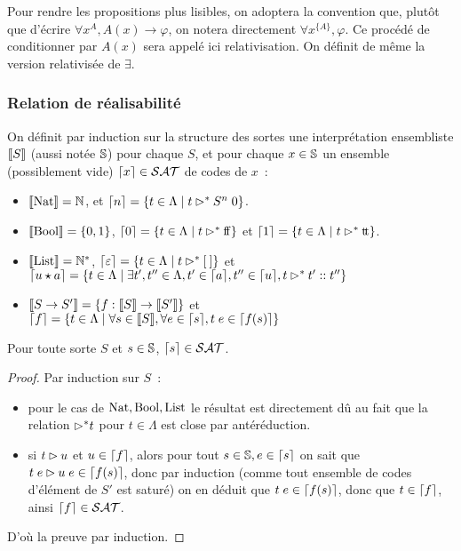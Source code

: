 \documentclass{article}
\begin{document}
\begin{nota}
  Pour rendre les propositions plus lisibles, on adoptera la convention que, plutôt que d'écrire $\forall x^A, A(x) \to \varphi$, on notera directement $\forall x^{\{A\}}, \varphi$. Ce procédé de conditionner par $A(x)$ sera appelé ici relativisation. On définit de même la version relativisée de $\exists$.
\end{nota}

\subsubsection{Relation de réalisabilité}

On définit par induction sur la structure des sortes une interprétation ensembliste $\llbracket S \rrbracket$ (aussi notée $\mathbb{S}$) pour chaque $S$, et pour chaque $x \in \mathbb{S}$ un ensemble (possiblement vide) $\lceil x \rceil\in \mathcal {SAT}$ de codes de $x$~:
\begin{itemize}
\item $\llbracket \mathrm{Nat} \rrbracket = \mathbb{N}$, et $\lceil n \rceil = \{t\in\Lambda\mid t \rhd^* S^n\;0\}$.
\item $\llbracket \mathrm{Bool} \rrbracket = \{0,1\}$, $\lceil 0 \rceil = \{t\in\Lambda\mid t \rhd^*\mathrm{f}\!\mathrm{f}\}$ et $\lceil 1 \rceil = \{t\in\Lambda\mid t \rhd^*\mathrm{t}\!\mathrm{t}\}$.
\item $\llbracket \mathrm{List} \rrbracket = \mathbb{N}^*$, $\lceil \varepsilon \rceil = \{t\in\Lambda\mid t \rhd^*[\:]\}$ et $\lceil u\star a \rceil = \{t \in \Lambda\mid \exists t',t'' \in \Lambda, t' \in \lceil a \rceil, t'' \in \lceil u \rceil, t \rhd^* t' :: t''\}$
\item $\llbracket S \to S' \rrbracket = \{f : \llbracket S \rrbracket \to \llbracket S' \rrbracket\}$ et $\lceil f \rceil = \{t\in \Lambda\mid \forall s \in \llbracket S \rrbracket, \forall e \in \lceil s \rceil, t\;e \in \lceil f(s) \rceil\}$
\end{itemize}

\begin{lem}
  Pour toute sorte $S$ et $s\in \mathbb{S}$, $\lceil s \rceil \in \mathcal {SAT}$.
\end{lem}

\begin{proof}
  Par induction sur $S$~:
  \begin{itemize}
  \item pour le cas de $\mathrm{Nat},\mathrm{Bool},\mathrm{List}$ le résultat est directement dû au fait que la relation $\rhd^* t$ pour $t\in \Lambda$ est close par antéréduction.
  \item si $t\rhd u$ et $u\in \lceil f \rceil$, alors pour tout $s\in \mathbb{S}, e \in \lceil s \rceil$ on sait que $t\;e\rhd u\;e \in \lceil f(s) \rceil$, donc par induction (comme tout ensemble de codes d'élément de $S'$ est saturé) on en déduit que $t\;e \in \lceil f(s) \rceil$, donc que $t\in \lceil f \rceil$, ainsi $\lceil f \rceil \in \mathcal {SAT}$.
  \end{itemize}
  D'où la preuve par induction.
\end{proof}
\end{document}
